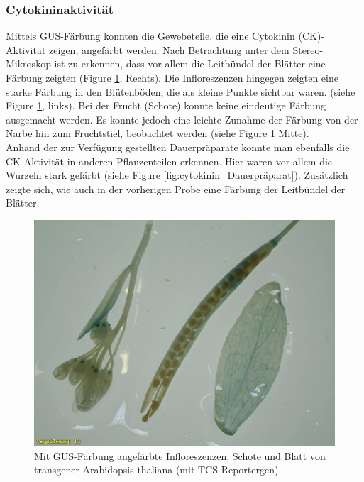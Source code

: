 \documentclass[10pt,a4paper]{article}
\begin{document}
		\subsubsection{Cytokininaktivität}
		Mittels GUS-Färbung konnten die Gewebeteile, die eine Cytokinin (CK)-Aktivität zeigen, angefärbt werden. Nach Betrachtung unter dem Stereo-Mikroskop ist zu erkennen, dass vor allem die Leitbündel der Blätter eine Färbung zeigten (Figure \ref{fig:cytokinin_TCS_Färbung}, Rechts). Die Infloreszenzen hingegen zeigten eine starke Färbung in den Blütenböden, die als kleine Punkte sichtbar waren. (siehe Figure \ref{fig:cytokinin_TCS_Färbung}, links). Bei der Frucht (Schote) konnte keine eindeutige Färbung ausgemacht werden. Es konnte jedoch eine leichte Zunahme der Färbung von der Narbe hin zum Fruchtstiel, beobachtet werden (siehe Figure \ref{fig:cytokinin_TCS_Färbung} Mitte).\\
		Anhand der zur Verfügung gestellten Dauerpräparate konnte man ebenfalls die CK-Aktivität in anderen Pflanzenteilen erkennen. Hier waren vor allem die Wurzeln stark gefärbt (siehe Figure \ref{fig:cytokinin_Dauerpräparat}). Zusätzlich zeigte sich, wie auch in der vorherigen Probe eine Färbung der Leitbündel der Blätter. 
		\begin{figure}[H]
			\centering
			\includegraphics[scale=0.3]{TCS_O+A.jpg}
			\caption{Mit GUS-Färbung angefärbte Infloreszenzen, Schote und Blatt von transgener Arabidopsis thaliana (mit TCS-Reportergen)}
			\label{fig:cytokinin_TCS_Färbung}
		\end{figure}	
		
\end{document}
